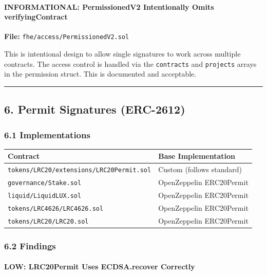 \documentclass[
]{article}
\newcounter{none} %
\begin{document}
\paragraph{INFORMATIONAL: PermissionedV2 Intentionally Omits
verifyingContract}\label{informational-permissionedv2-intentionally-omits-verifyingcontract}

\textbf{File:} \texttt{fhe/access/PermissionedV2.sol}

This is intentional design to allow single signatures to work across
multiple contracts. The access control is handled via the
\texttt{contracts} and \texttt{projects} arrays in the permission
struct. This is documented and acceptable.

\begin{center}\rule{0.5\linewidth}{0.5pt}\end{center}

\subsection{6. Permit Signatures
(ERC-2612)}\label{6-permit-signatures-erc-2612}

\subsubsection{6.1 Implementations}\label{61-implementations}

{\def\LTcaptype{none} %
\begin{longtable}[]{@{}ll@{}}
\toprule\noalign{}
Contract & Base Implementation \\
\midrule\noalign{}
\endhead
\bottomrule\noalign{}
\endlastfoot
\texttt{tokens/LRC20/extensions/LRC20Permit.sol} & Custom (follows
standard) \\
\texttt{governance/Stake.sol} & OpenZeppelin ERC20Permit \\
\texttt{liquid/LiquidLUX.sol} & OpenZeppelin ERC20Permit \\
\texttt{tokens/LRC4626/LRC4626.sol} & OpenZeppelin ERC20Permit \\
\texttt{tokens/LRC20/LRC20.sol} & OpenZeppelin ERC20Permit \\
\end{longtable}
}

\subsubsection{6.2 Findings}\label{62-findings}

\paragraph{LOW: LRC20Permit Uses ECDSA.recover
Correctly}\label{low-lrc20permit-uses-ecdsarecover-correctly}
\end{document}

